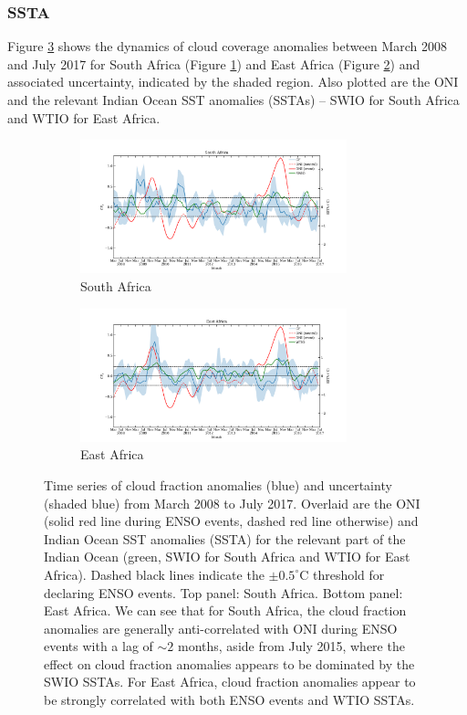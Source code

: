 \subsubsection{SSTA}
Figure \ref{fig:cf_temporal} shows the dynamics of cloud coverage
anomalies between March 2008 and July 2017 for South Africa (Figure
\ref{fig:cf_t_south}) and East Africa (Figure \ref{fig:cf_t_east}) and
associated uncertainty, indicated by the shaded region. Also plotted
are the ONI and the relevant Indian Ocean SST anomalies (SSTAs) -- SWIO
for South Africa and WTIO for East Africa.
\begin{figure}
  \centering
  \begin{subfigure}{\textwidth}
    \centering
    \includegraphics[width=0.85\textwidth]{figures/cf_oni_io_capetown_5window_median}
    \caption{South Africa}
    \label{fig:cf_t_south}
  \end{subfigure}
  \begin{subfigure}{\textwidth}
    \centering
    \includegraphics[width=0.85\textwidth]{figures/cf_oni_io_eastafrica_5window_median}
    \caption{East Africa}
    \label{fig:cf_t_east}
    \end{subfigure}
  \caption{Time series of cloud fraction anomalies (blue) and
    uncertainty (shaded blue) from March 2008 to July 2017. Overlaid
    are the ONI (solid red line during ENSO events, dashed red line
    otherwise) and Indian Ocean SST anomalies (SSTA) for the relevant
    part of the Indian Ocean (green, SWIO for South Africa and WTIO
    for East Africa). Dashed black lines indicate the $\pm0.5^{\circ}$C
    threshold for declaring ENSO events. Top panel: South
    Africa. Bottom panel: East Africa. We can see that for South
    Africa, the cloud fraction anomalies are generally anti-correlated
    with ONI during ENSO events with a lag of $\sim2$ months, aside from
    July 2015, where the effect on cloud fraction anomalies appears to
    be dominated by the SWIO SSTAs. For East Africa, cloud fraction
    anomalies appear to be strongly correlated with both ENSO events
    and WTIO SSTAs.}
  \label{fig:cf_temporal}
\end{figure}

